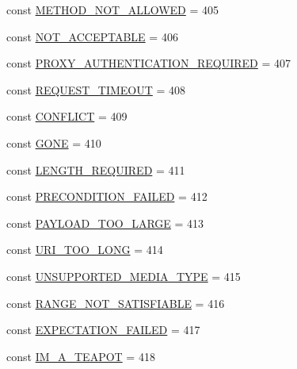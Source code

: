 \begin{DoxyCompactItemize}
\item 
const \hyperlink{classlibresignage_1_1api_1_1HTTPStatus_ae5dd2a908c6d823e4dd2b9ba88688d2b}{M\+E\+T\+H\+O\+D\+\_\+\+N\+O\+T\+\_\+\+A\+L\+L\+O\+W\+ED} = 405
\item 
const \hyperlink{classlibresignage_1_1api_1_1HTTPStatus_a63785992d4a46aac65aa0296815ff5b2}{N\+O\+T\+\_\+\+A\+C\+C\+E\+P\+T\+A\+B\+LE} = 406
\item 
const \hyperlink{classlibresignage_1_1api_1_1HTTPStatus_a37bfd8963bfd97b16038ab2ed15a2d75}{P\+R\+O\+X\+Y\+\_\+\+A\+U\+T\+H\+E\+N\+T\+I\+C\+A\+T\+I\+O\+N\+\_\+\+R\+E\+Q\+U\+I\+R\+ED} = 407
\item 
const \hyperlink{classlibresignage_1_1api_1_1HTTPStatus_ab7e09dda2971492893920dc73fa31bc6}{R\+E\+Q\+U\+E\+S\+T\+\_\+\+T\+I\+M\+E\+O\+UT} = 408
\item 
const \hyperlink{classlibresignage_1_1api_1_1HTTPStatus_ab36533257dbabc15fae6a0771436b365}{C\+O\+N\+F\+L\+I\+CT} = 409
\item 
const \hyperlink{classlibresignage_1_1api_1_1HTTPStatus_a6e31b47ea2dbfecef4301092dad37ec9}{G\+O\+NE} = 410
\item 
const \hyperlink{classlibresignage_1_1api_1_1HTTPStatus_aba11d994c89c4ced5bc3b16e9c562705}{L\+E\+N\+G\+T\+H\+\_\+\+R\+E\+Q\+U\+I\+R\+ED} = 411
\item 
const \hyperlink{classlibresignage_1_1api_1_1HTTPStatus_a0ef844e17b0b4613588af422323b1c0c}{P\+R\+E\+C\+O\+N\+D\+I\+T\+I\+O\+N\+\_\+\+F\+A\+I\+L\+ED} = 412
\item 
const \hyperlink{classlibresignage_1_1api_1_1HTTPStatus_ad63b326be5c1979b2c5a3a15f0ba6875}{P\+A\+Y\+L\+O\+A\+D\+\_\+\+T\+O\+O\+\_\+\+L\+A\+R\+GE} = 413
\item 
const \hyperlink{classlibresignage_1_1api_1_1HTTPStatus_a390e0088c66c64c39278842ef9b2cb3b}{U\+R\+I\+\_\+\+T\+O\+O\+\_\+\+L\+O\+NG} = 414
\item 
const \hyperlink{classlibresignage_1_1api_1_1HTTPStatus_adf52a8c5d34f23c2587f583ec5e667e1}{U\+N\+S\+U\+P\+P\+O\+R\+T\+E\+D\+\_\+\+M\+E\+D\+I\+A\+\_\+\+T\+Y\+PE} = 415
\item 
const \hyperlink{classlibresignage_1_1api_1_1HTTPStatus_a1937635f8a6ce01f16eb7728f57478cc}{R\+A\+N\+G\+E\+\_\+\+N\+O\+T\+\_\+\+S\+A\+T\+I\+S\+F\+I\+A\+B\+LE} = 416
\item 
const \hyperlink{classlibresignage_1_1api_1_1HTTPStatus_a8436e17243d1bece269f324bf699c9dd}{E\+X\+P\+E\+C\+T\+A\+T\+I\+O\+N\+\_\+\+F\+A\+I\+L\+ED} = 417
\item 
const \hyperlink{classlibresignage_1_1api_1_1HTTPStatus_aae992f1403ce265badad4c97e641b8d0}{I\+M\+\_\+\+A\+\_\+\+T\+E\+A\+P\+OT} = 418

\end{DoxyCompactItemize}
